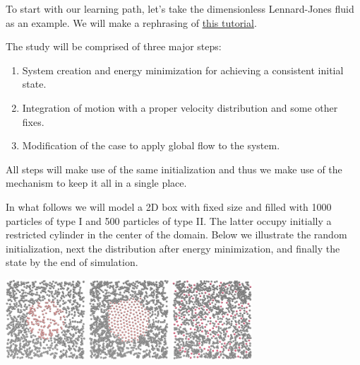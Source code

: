 \begin{frame}{\secname}
To start with our learning path, let's take the dimensionless Lennard-Jones fluid as an example. We will make a rephrasing of \href{https://lammpstutorials.github.io/tutorials/01-SimpleMolecularSimulation.html}{this tutorial}.

\vspace{1cm}

The study will be comprised of three major steps:

\vspace{0.5cm}

\begin{enumerate}
\item System creation and energy minimization for achieving a consistent initial state.
\item Integration of motion with a proper velocity distribution and some other fixes.
\item Modification of the case to apply global flow to the system.
\end{enumerate}

\vspace{0.5cm}

All steps will make use of the same initialization and thus we make use of the  mechanism to keep it all in a single place.
\end{frame}

\begin{frame}[fragile]{\secname}{\subsecname}
In what follows we will model a 2D box with fixed size and filled with 1000 particles of type {I} and 500 particles of type {II}. The latter occupy initially a restricted cylinder in the center of the domain. Below we illustrate the random initialization, next the distribution after energy minimization, and finally the state by the end of simulation.

\vspace{0.5cm}

{%
\hfill%
\includegraphics[width=3cm]{media/000-lennard-jones-init-random.png}
\hfill%
\includegraphics[width=3cm]{media/001-lennard-jones-init-minimized.png}
\hfill%
\includegraphics[width=3cm]{media/002-lennard-jones-final-state.png}
\hfill%
}
\end{frame}

